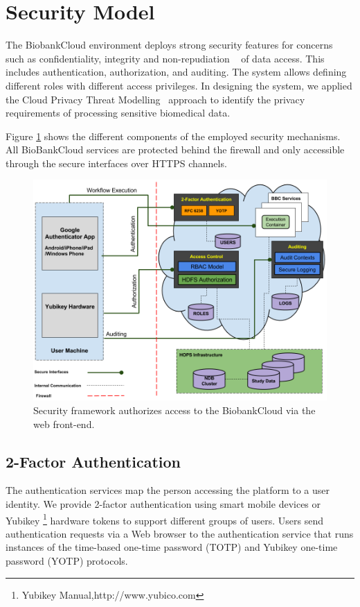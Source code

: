 \section{Security Model}

The BiobankCloud environment deploys strong security features for concerns such as confidentiality, integrity and non-repudiation ~\cite{BBCSEC} of data access. This includes authentication, authorization, and auditing. The system allows defining different roles with different access privileges. In designing the system, we applied the Cloud Privacy Threat Modelling~\cite {CPTM} approach to identify the privacy requirements of processing sensitive biomedical data.


Figure \ref{fig:security} shows the different components of the employed security mechanisms. All BioBankCloud services are protected behind the firewall and only accessible through the secure interfaces over HTTPS channels.

\begin{figure}[h]
\centering
\includegraphics[width=\textwidth]{./imgs/security.png}
\caption{Security framework authorizes access to the BiobankCloud via the web front-end.}
\label{fig:security}
\end{figure}

\subsection{2-Factor Authentication}
The authentication services map the person accessing the platform to a user identity. We provide 2-factor authentication using smart mobile devices or Yubikey \footnote {Yubikey Manual,http://www.yubico.com} hardware tokens to support different groups of users. Users send authentication requests via a Web browser to the authentication service that runs instances of the time-based one-time password (TOTP) and Yubikey one-time password (YOTP) protocols.

